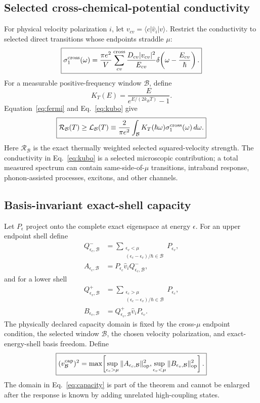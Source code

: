 \documentclass[aps,twocolumn,superscriptaddress,longbibliography]{revtex4-2}
\newcommand{\op}{\operatorname{op}}
\newcommand{\cB}{\mathcal B}
\newcommand{\cR}{\mathcal R}
\newcommand{\cL}{\mathcal L}
\begin{document}
\subsection{Selected cross-chemical-potential conductivity}

For physical velocity polarization $i$, let $v_{cv}=\langle c|\hat v_i|v\rangle$. Restrict the conductivity to selected direct transitions whose endpoints straddle $\mu$:
\begin{equation}
\boxed{
\sigma_1^{\rm cross}(\omega)=\frac{\pi e^2}{V}
\sum_{cv}^{\rm cross}
\frac{D_{cv}|v_{cv}|^2}{E_{cv}}
\delta\!\left(\omega-\frac{E_{cv}}{\hbar}\right).}
\label{eq:kubo}
\end{equation}
For a measurable positive-frequency window $\cB$, define
\begin{equation}
K_T(E)=\frac{E}{e^{E/(2k_BT)}-1}.
\label{eq:kernel}
\end{equation}
Equation~\eqref{eq:fermi} and Eq.~\eqref{eq:kubo} give
\begin{equation}
\boxed{
\cR_{\cB}(T)\ge \cL_{\cB}(T)
\equiv \frac{2}{\pi e^2}\int_{\cB}
K_T(\hbar\omega)\sigma_1^{\rm cross}(\omega)\,d\omega .}
\label{eq:kubo-lower}
\end{equation}
Here $\cR_{\cB}$ is the exact thermally weighted selected squared-velocity strength. The conductivity in Eq.~\eqref{eq:kubo} is a selected microscopic contribution; a total measured spectrum can contain same-side-of-$\mu$ transitions, intraband response, phonon-assisted processes, excitons, and other channels.

\subsection{Basis-invariant exact-shell capacity}

Let $P_\epsilon$ project onto the complete exact eigenspace at energy $\epsilon$. For an upper endpoint shell define
\begin{align}
Q^-_{\epsilon_c,\cB}&=\sum_{\substack{\epsilon_v<\mu\\(\epsilon_c-\epsilon_v)/\hbar\in\cB}}P_{\epsilon_v},\\
A_{\epsilon_c,\cB}&=P_{\epsilon_c}\hat v_iQ^-_{\epsilon_c,\cB},
\end{align}
and for a lower shell
\begin{align}
Q^+_{\epsilon_v,\cB}&=\sum_{\substack{\epsilon_c>\mu\\(\epsilon_c-\epsilon_v)/\hbar\in\cB}}P_{\epsilon_c},\\
B_{\epsilon_v,\cB}&=Q^+_{\epsilon_v,\cB}\hat v_iP_{\epsilon_v}.
\end{align}
The physically declared capacity domain is fixed by the cross-$\mu$ endpoint condition, the selected window $\cB$, the chosen velocity polarization, and exact-energy-shell basis freedom. Define
\begin{equation}
\boxed{
(v_{\cB}^{\rm cap})^2=
\max\!\left[
\sup_{\epsilon_c>\mu}\|A_{\epsilon_c,\cB}\|_{\op}^2,
\sup_{\epsilon_v<\mu}\|B_{\epsilon_v,\cB}\|_{\op}^2
\right].}
\label{eq:capacity}
\end{equation}
The domain in Eq.~\eqref{eq:capacity} is part of the theorem and cannot be enlarged after the response is known by adding unrelated high-coupling states.
\end{document}
